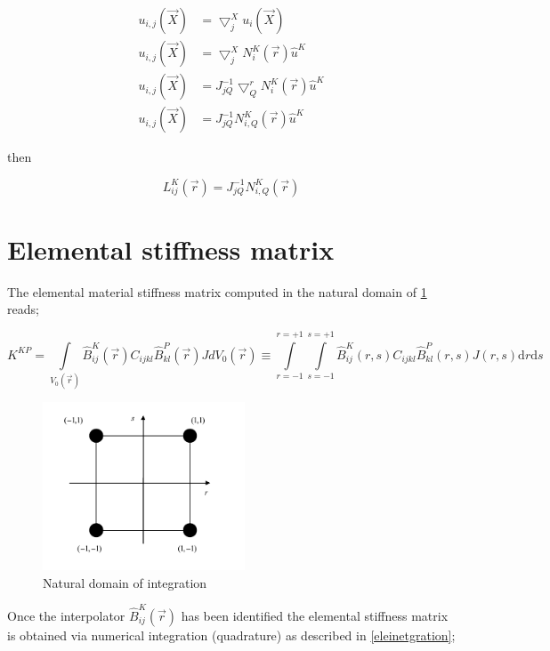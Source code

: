 \[
\begin{aligned}
u_{i,j}(\vec{X})&=\bigtriangledown_j^X u_i(\vec{X})\\
u_{i,j}(\vec{X})&=\bigtriangledown_j^X N_i^K(\vec{r})\hat{u}^K\\
u_{i,j}(\vec{X})&=J_{jQ}^{-1}\bigtriangledown_Q^r N_i^K(\vec{r})\hat{u}^K\\
u_{i,j}(\vec{X})&=J_{jQ}^{-1}N_{i,Q}^K(\vec{r})\hat{u}^K
\end{aligned}
\]

then

\begin{equation}
L_{ij}^K(\vec{r})=J_{jQ}^{-1}N_{i,Q}^K(\vec{r})
\label{fundamental interpolator}
\end{equation}

\section*{Elemental stiffness matrix}
The elemental material stiffness matrix computed in the natural domain of \cref{fig:Nat domain} reads;

\begin{equation}
K^{KP}=\int\limits_{V_0(\vec{r})} \hat{B}_{ij}^K(\vec{r}) C_{ijkl} \hat{B}_{kl}^P(\vec{r})J dV_0(\vec{r})\equiv \int\limits_{r=-1}^{r=+1}\int\limits_{s=-1}^{s=+1} \hat{B}_{ij}^K(r,s) C_{ijkl} \hat{B}_{kl}^P(r,s)J(r,s) \mathrm{d}r\mathrm{d}s
\label{elematrix}
\end{equation}



\begin{figure}[h]
\centering
\includegraphics[width=6cm]{img/figure3.pdf}
\caption{Natural domain of integration}
\label{fig:Nat domain}
\end{figure}	 		
 

Once the interpolator $\hat{B}_{ij}^K(\vec{r})$ has been identified the elemental stiffness matrix is obtained via numerical integration (quadrature) as described in \eqref{eleinetgration};


